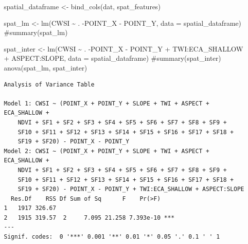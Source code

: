 \documentclass[
  letterpaper,
  DIV=11,
  numbers=noendperiod]{scrartcl}
\newenvironment{Shaded}{\begin{snugshade}}{\end{snugshade}}
\newcommand{\AttributeTok}[1]{\textcolor[rgb]{0.40,0.45,0.13}{#1}}
\newcommand{\CommentTok}[1]{\textcolor[rgb]{0.37,0.37,0.37}{#1}}
\newcommand{\DecValTok}[1]{\textcolor[rgb]{0.68,0.00,0.00}{#1}}
\newcommand{\FunctionTok}[1]{\textcolor[rgb]{0.28,0.35,0.67}{#1}}
\newcommand{\NormalTok}[1]{\textcolor[rgb]{0.00,0.23,0.31}{#1}}
\newcommand{\OtherTok}[1]{\textcolor[rgb]{0.00,0.23,0.31}{#1}}
\newcommand{\SpecialCharTok}[1]{\textcolor[rgb]{0.37,0.37,0.37}{#1}}
\begin{document}
\begin{Shaded}
\begin{Highlighting}[]
\NormalTok{spatial\_dataframe }\OtherTok{\textless{}{-}} \FunctionTok{bind\_cols}\NormalTok{(dat, spat\_features)}
\end{Highlighting}
\end{Shaded}

\begin{Shaded}
\begin{Highlighting}[]
\NormalTok{spat\_lm }\OtherTok{\textless{}{-}} \FunctionTok{lm}\NormalTok{(CWSI }\SpecialCharTok{\textasciitilde{}}\NormalTok{ . }\SpecialCharTok{{-}}\NormalTok{POINT\_X }\SpecialCharTok{{-}}\NormalTok{ POINT\_Y, }\AttributeTok{data =}\NormalTok{ spatial\_dataframe)}
\CommentTok{\#summary(spat\_lm)}

\NormalTok{spat\_inter }\OtherTok{\textless{}{-}} \FunctionTok{lm}\NormalTok{(CWSI }\SpecialCharTok{\textasciitilde{}}\NormalTok{ . }\SpecialCharTok{{-}}\NormalTok{POINT\_X }\SpecialCharTok{{-}}\NormalTok{ POINT\_Y }\SpecialCharTok{+}\NormalTok{ TWI}\SpecialCharTok{:}\NormalTok{ECA\_SHALLOW }\SpecialCharTok{+}\NormalTok{ ASPECT}\SpecialCharTok{:}\NormalTok{SLOPE, }\AttributeTok{data =}\NormalTok{ spatial\_dataframe)}
\CommentTok{\#summary(spat\_inter)}
\FunctionTok{anova}\NormalTok{(spat\_lm, spat\_inter)}
\end{Highlighting}
\end{Shaded}

\begin{verbatim}
Analysis of Variance Table

Model 1: CWSI ~ (POINT_X + POINT_Y + SLOPE + TWI + ASPECT + ECA_SHALLOW + 
    NDVI + SF1 + SF2 + SF3 + SF4 + SF5 + SF6 + SF7 + SF8 + SF9 + 
    SF10 + SF11 + SF12 + SF13 + SF14 + SF15 + SF16 + SF17 + SF18 + 
    SF19 + SF20) - POINT_X - POINT_Y
Model 2: CWSI ~ (POINT_X + POINT_Y + SLOPE + TWI + ASPECT + ECA_SHALLOW + 
    NDVI + SF1 + SF2 + SF3 + SF4 + SF5 + SF6 + SF7 + SF8 + SF9 + 
    SF10 + SF11 + SF12 + SF13 + SF14 + SF15 + SF16 + SF17 + SF18 + 
    SF19 + SF20) - POINT_X - POINT_Y + TWI:ECA_SHALLOW + ASPECT:SLOPE
  Res.Df    RSS Df Sum of Sq      F    Pr(>F)    
1   1917 326.67                                  
2   1915 319.57  2     7.095 21.258 7.393e-10 ***
---
Signif. codes:  0 '***' 0.001 '**' 0.01 '*' 0.05 '.' 0.1 ' ' 1
\end{verbatim}

\begin{Shaded}
\end{Shaded}
\end{document}
